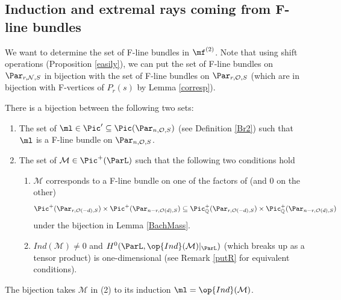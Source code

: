 \subsection{Induction and extremal rays coming from F-line bundles}
We want to determine the set of F-line bundles in $\mf^{(2)}$. Note that using shift operations (Proposition \ref{easily}), we can put the set of F-line bundles on $\Par_{r,\mathcal{N},S}$ in bijection with the set of F-line bundles
on   $\Par_{r,\mathcal{O},S}$ (which are in bijection with F-vertices of $P_r(s)$ by Lemma \ref{corresp}).
\begin{proposition}
\notready\label{condensed}
There is a bijection between the following two sets:
\begin{enumerate}
\item The set of  $\ml\in \Pic'\subseteq\Pic(\Par_{n,\mathcal{O},S})$ (see Definition  \ref{Br2}) such that $\ml$ is a F-line bundle on  $\Par_{n,\mathcal{O},S}$.
\item The set of $\mathcal{M}\in  \Pic^{+}(\ParL)$ such that the following two conditions hold
\begin{enumerate}
\item[(a)]$\mathcal{M}$ corresponds to a F-line bundle on one of the factors of (and $0$ on the other)
$$\Pic^+(\Par_{r,\mathcal{O}(-d),S})\times \Pic^+(\Par_{n-r,\mathcal{O}(d),S})\subseteq \Pic^+_{\Bbb{Q}}(\Par_{r,\mathcal{O}(-d),S})\times \Pic^+_{\Bbb{Q}}(\Par_{n-r,\mathcal{O}(d),S}) $$ under the  bijection in Lemma \ref{BachMass}.
\item[(b)] $Ind(\mathcal{M})\neq 0$ and $H^0(\ParL,\op{Ind}(\mathcal{M})|_{\ParL})$ (which breaks up as a tensor product)  is one-dimensional (see Remark \ref{putR} for equivalent conditions).
\end{enumerate}
\end{enumerate}
The bijection takes $\mathcal{M}$ in (2) to its induction $\ml=\op{Ind}(\mathcal{M})$.
\end{proposition}

